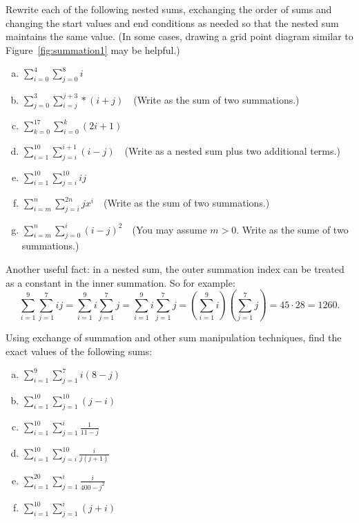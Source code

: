 \begin {exercise}{}
Rewrite each of the following nested sums, exchanging the order of sums and changing the start values and end conditions as needed so that the nested sum maintains the same value. (In some cases, drawing a grid point diagram similar to Figure~\ref{fig:summation1} may be helpful.)
\begin {enumerate}[(a)]
\item
$\displaystyle{\sum_{i=0}^{4}\sum_{j=0}^{8}i}$
\item
$\displaystyle{\sum_{j=0}^{3} \sum_{i=j}^{j+3}*(i+j)}$~~(Write as the sum of two summations.)
\item
$\displaystyle{\sum_{k=0}^{17}\sum_{i=0}^{k}(2i+1) }$
\item
$\displaystyle{\sum_{i=1}^{10}\sum_{j=i}^{i+1} (i-j) }$~~(Write as a nested sum plus two additional terms.)
\item
$\displaystyle{\sum_{i=1}^{10}\sum_{j=i}^{10} ij }$
\item
$\displaystyle{\sum_{i=m}^{n}\sum_{j=i}^{2n}jx^i }$~~(Write as the sum of two summations.)
\item
$\displaystyle{\sum_{i=m}^{n}\sum_{j=0}^{i}(i-j)^2 }$~~(You may assume $m>0$.  Write as the sume of two summations.)
\end {enumerate}
\end{exercise}
Another useful fact: in a nested sum, the outer summation index can be treated as a constant in the inner summation.  So for example:
\[ \sum_{i=1}^{9} \sum_{j=1}^7 ij = \sum_{i=1}^{9} i \sum_{j=1}^7 j = \sum_{i=1}^{9} i\sum_{j=1}^7 j = \left(\sum_{i=1}^{9} i\right) \left(\sum_{j=1}^7 j\right) = 45\cdot 28=1260. \]
\begin{exercise}{}
Using exchange of summation and other sum manipulation techniques, find the exact values of the following sums:


\begin{multicols}{2}
\begin{enumerate}[(a)]
\item
$\displaystyle{\sum_{i=1}^{9} \sum_{j=1}^{7} i(8-j)}$
\item
$\displaystyle{\sum_{i=1}^{10} \sum_{j=1}^{10} (j-i)}$
\item
$\displaystyle{\sum_{i=1}^{10} \sum_{j=1}^i \frac{1}{11-j}}$
\item
$\displaystyle{\sum_{i=1}^{10} \sum_{j=i}^{10} \frac{i}{j(j+1)}}$
\item
$\displaystyle{\sum_{i=1}^{20} \sum_{j=1}^i \frac{i}{400-j^2}}$
\item
$\displaystyle{\sum_{i=1}^{10} \sum_{j=1}^i (j+i)}$
\end{enumerate}
\end{multicols}
\end{exercise}

